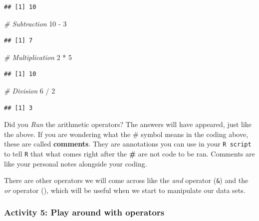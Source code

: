 \documentclass[
]{book}
\newenvironment{Shaded}{\begin{snugshade}}{\end{snugshade}}
\newcommand{\CommentTok}[1]{\textcolor[rgb]{0.56,0.35,0.01}{\textit{#1}}}
\newcommand{\DecValTok}[1]{\textcolor[rgb]{0.00,0.00,0.81}{#1}}
\newcommand{\SpecialCharTok}[1]{\textcolor[rgb]{0.00,0.00,0.00}{#1}}
\begin{document}
\begin{verbatim}
## [1] 10
\end{verbatim}

\begin{Shaded}
\begin{Highlighting}[]
\CommentTok{\# Subtraction}
\DecValTok{10} \SpecialCharTok{{-}} \DecValTok{3}
\end{Highlighting}
\end{Shaded}

\begin{verbatim}
## [1] 7
\end{verbatim}

\begin{Shaded}
\begin{Highlighting}[]
\CommentTok{\# Multiplication}
\DecValTok{2} \SpecialCharTok{*} \DecValTok{5}
\end{Highlighting}
\end{Shaded}

\begin{verbatim}
## [1] 10
\end{verbatim}

\begin{Shaded}
\begin{Highlighting}[]
\CommentTok{\# Division}
\DecValTok{6} \SpecialCharTok{/} \DecValTok{2}
\end{Highlighting}
\end{Shaded}

\begin{verbatim}
## [1] 3
\end{verbatim}

Did you \emph{Run} the arithmetic operators? The answers will have appeared, just like the above. If you are wondering what the \# symbol means in the coding above, these are called \textbf{comments}. They are annotations you can use in your \texttt{R\ script} to tell \texttt{R} that what comes right after the \textbf{\#} are not code to be ran. Comments are like your personal notes alongside your coding.

There are other operators we will come across like the \emph{and} operator (\texttt{\&}) and the \emph{or} operator (\texttt{\textbar{}}), which will be useful when we start to manipulate our data sets.

\hypertarget{activity-5-play-around-with-operators}{%
\subsubsection{Activity 5: Play around with operators}\label{activity-5-play-around-with-operators}}
\end{document}
